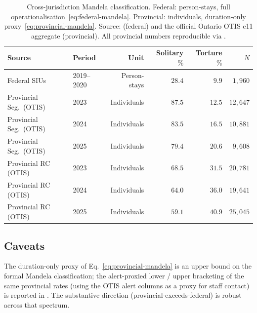 \documentclass[article,shortnames,nojss]{jss}
\newcommand{\OTIS}{\textsf{OTIS}}
\begin{document}
\begin{table}[h]
\centering
\caption{Cross-jurisdiction Mandela classification. Federal:
person-stays, full operationalisation~\eqref{eq:federal-mandela}.
Provincial: individuals, duration-only proxy~\eqref{eq:provincial-mandela}.
Source: \citealt{SprottDoob2021} (federal) and the official Ontario
\OTIS{} c11 aggregate (provincial). All provincial numbers
reproducible via
.}
\label{tab:res-mandela}
\small
\begin{tabular}{llrrrr}
\toprule
Source & Period & Unit & Solitary $\%$ & Torture $\%$ & $N$ \\
\midrule
Federal SIUs               & 2019--2020 & Person-stays   & $28.4$ & $9.9$  & $1{,}960$ \\
\midrule
Provincial Seg.\ (\OTIS{}) & 2023       & Individuals    & $87.5$ & $12.5$ & $12{,}647$ \\
Provincial Seg.\ (\OTIS{}) & 2024       & Individuals    & $83.5$ & $16.5$ & $10{,}881$ \\
Provincial Seg.\ (\OTIS{}) & 2025       & Individuals    & $79.4$ & $20.6$ & $9{,}608$ \\
\midrule
Provincial RC (\OTIS{})    & 2023       & Individuals    & $68.5$ & $31.5$ & $20{,}781$ \\
Provincial RC (\OTIS{})    & 2024       & Individuals    & $64.0$ & $36.0$ & $19{,}641$ \\
Provincial RC (\OTIS{})    & 2025       & Individuals    & $59.1$ & $40.9$ & $25{,}045$ \\
\bottomrule
\end{tabular}
\end{table}

\subsection{Caveats}
\label{sec:mandela-caveats}

The duration-only proxy of Eq.~\eqref{eq:provincial-mandela} is an
upper bound on the formal Mandela classification; the
alert-proxied lower / upper bracketing of the same provincial
rates (using the OTIS alert columns as a proxy for staff
contact) is reported in \citet{Ruhela2026MRM}.
The substantive direction (provincial-exceeds-federal) is robust
across that spectrum.
\end{document}
